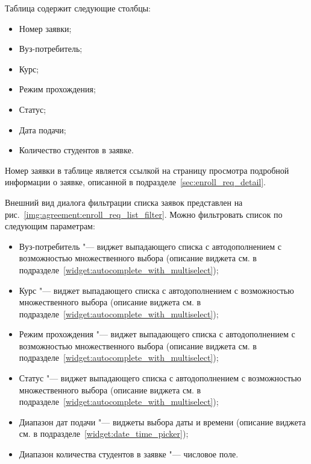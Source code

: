 Таблица содержит следующие столбцы:
\begin{itemize}
	\item Номер заявки;
	\item Вуз-потребитель;
	\item Курс;
	\item Режим прохождения;
	\item Статус;
	\item Дата подачи;
	\item Количество студентов в заявке.
\end{itemize}

 Номер заявки в таблице является ссылкой на страницу просмотра подробной информации о заявке, 
описанной в подразделе~\ref{sec:enroll_req_detail}.

Внешний вид диалога фильтрации списка заявок представлен на рис.~\ref{img:agreement:enroll_req_list_filter}.
Можно фильтровать список по следующим параметрам:
\begin{itemize}
	\item Вуз-потребитель "--- виджет выпадающего списка с автодополнением с возможностью множественного выбора 
	(описание виджета см. в подразделе~\ref{widget:autocomplete_with_multiselect});
	\item Курс "--- виджет выпадающего списка с автодополнением с возможностью множественного выбора 
	(описание виджета см. в подразделе~\ref{widget:autocomplete_with_multiselect});
	\item Режим прохождения "--- виджет выпадающего списка с автодополнением с возможностью множественного выбора 
	(описание виджета см. в подразделе~\ref{widget:autocomplete_with_multiselect});
	\item Статус "--- виджет выпадающего списка с автодополнением с возможностью множественного выбора 
	(описание виджета см. в подразделе~\ref{widget:autocomplete_with_multiselect});
	\item Диапазон дат подачи "--- виджеты выбора даты и времени 
	(описание виджета см. в подразделе~\ref{widget:date_time_picker});
	\item Диапазон количества студентов в заявке "--- числовое поле.
\end{itemize}

